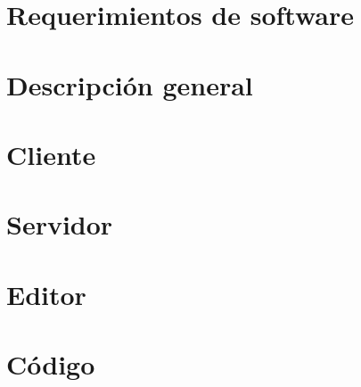 \documentclass{article}
\begin{document}
\pagestyle{fancy}
\renewcommand{\sectionmark}[1]{\markboth{}{\thesection\ \ #1}}
\chead{}
\rhead{\codMateria - \nombreMateria}
\lfoot{}
\cfoot{\thepage}
\rfoot{}

\newpage

\section{Requerimientos de software}
\label{sec:soft}


\section{Descripción general}
\label{sec:descripcion_general}


\section{Cliente}
\label{sec:ciente}


\section{Servidor}
\label{sec:servidor}


\section{Editor}
\label{sec:editor}


\section{Código}
\label{sec:codigo}

\end{document}
